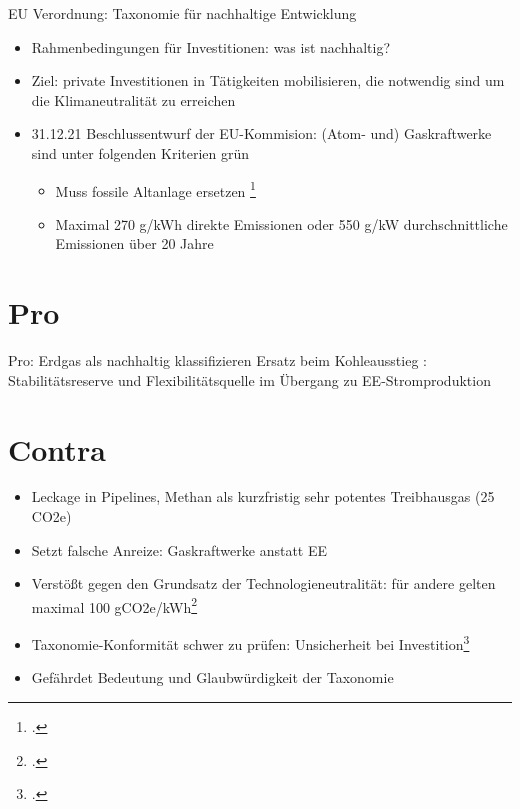 \documentclass[10pt]{beamer}
\begin{document}
\begin{frame}{EU Verordnung: Taxonomie für nachhaltige Entwicklung}
  \small
  \begin{itemize}
    \item Rahmenbedingungen für Investitionen: was ist nachhaltig? 
    \item Ziel: private Investitionen in Tätigkeiten mobilisieren, die notwendig sind um die Klimaneutralität zu erreichen 
    \item 31.12.21 Beschlussentwurf der EU-Kommision: 
      (Atom- und) Gaskraftwerke sind unter folgenden Kriterien grün 
    \begin{itemize}
      \item Muss fossile Altanlage ersetzen \footcite{taz-taxonomie}
      \item Maximal 270 g/kWh direkte Emissionen oder 550 g/kW durchschnittliche Emissionen über 20 Jahre 
    \end{itemize}
  \end{itemize}
\end{frame}

\section{Pro}


\begin{frame}{Pro: Erdgas als nachhaltig klassifizieren}
    Ersatz beim Kohleausstieg :
    Stabilitätsreserve und Flexibilitätsquelle im Übergang zu EE-Stromproduktion 
\end{frame}

\section{Contra}

\begin{frame}
  \begin{itemize}
    \item Leckage in Pipelines, Methan als kurzfristig sehr potentes Treibhausgas (25 CO2e)
    \item Setzt falsche Anreize: Gaskraftwerke anstatt EE
    \item Verstößt gegen den Grundsatz der Technologieneutralität: für andere gelten maximal 100 gCO2e/kWh\footcite{uba}
    \item Taxonomie-Konformität schwer zu prüfen: Unsicherheit bei Investition\footcite{uba}
    \item Gefährdet Bedeutung und Glaubwürdigkeit der Taxonomie
  \end{itemize}
\end{frame}
\end{document}
